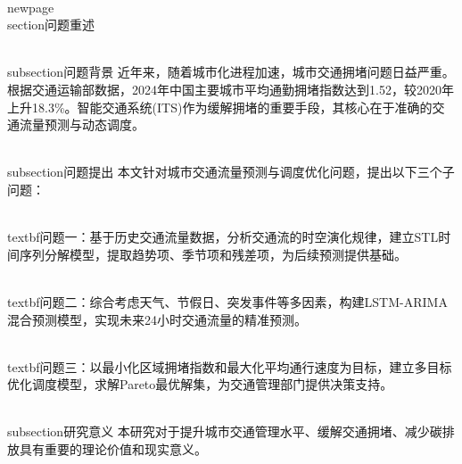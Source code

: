 \\newpage
\\section{问题重述}

\\subsection{问题背景}
近年来，随着城市化进程加速，城市交通拥堵问题日益严重。根据交通运输部数据，2024年中国主要城市平均通勤拥堵指数达到1.52，较2020年上升18.3\%。智能交通系统(ITS)作为缓解拥堵的重要手段，其核心在于准确的交通流量预测与动态调度。

\\subsection{问题提出}
本文针对城市交通流量预测与调度优化问题，提出以下三个子问题：

\\textbf{问题一}：基于历史交通流量数据，分析交通流的时空演化规律，建立STL时间序列分解模型，提取趋势项、季节项和残差项，为后续预测提供基础。

\\textbf{问题二}：综合考虑天气、节假日、突发事件等多因素，构建LSTM-ARIMA混合预测模型，实现未来24小时交通流量的精准预测。

\\textbf{问题三}：以最小化区域拥堵指数和最大化平均通行速度为目标，建立多目标优化调度模型，求解Pareto最优解集，为交通管理部门提供决策支持。

\\subsection{研究意义}
本研究对于提升城市交通管理水平、缓解交通拥堵、减少碳排放具有重要的理论价值和现实意义。
